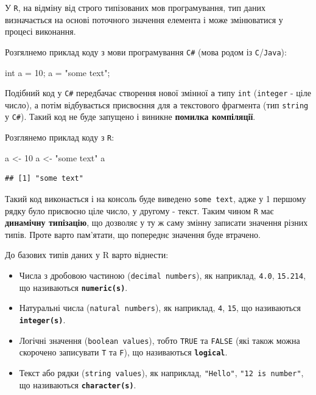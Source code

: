 \documentclass[
]{book}
\newenvironment{Shaded}{\begin{snugshade}}{\end{snugshade}}
\newcommand{\DataTypeTok}[1]{\textcolor[rgb]{0.13,0.29,0.53}{#1}}
\newcommand{\DecValTok}[1]{\textcolor[rgb]{0.00,0.00,0.81}{#1}}
\newcommand{\NormalTok}[1]{#1}
\newcommand{\OtherTok}[1]{\textcolor[rgb]{0.56,0.35,0.01}{#1}}
\newcommand{\StringTok}[1]{\textcolor[rgb]{0.31,0.60,0.02}{#1}}
\providecommand{\tightlist}{%
  \setlength{\itemsep}{0pt}\setlength{\parskip}{0pt}}
\begin{document}
У \texttt{R}, на відміну від строго типізованих мов програмування, тип даних визначається на основі поточного значення елемента і може змінюватися у процесі виконання.

Розгялнемо приклад коду з мови програмування \texttt{C\#} (мова родом із \texttt{C}/\texttt{Java}):

\begin{Shaded}
\begin{Highlighting}[]
\DataTypeTok{int}\NormalTok{ a = }\DecValTok{10}\NormalTok{;}
\NormalTok{a = }\StringTok{"some text"}\NormalTok{;}
\end{Highlighting}
\end{Shaded}

Подібний код у \texttt{C\#} передбачає створення нової змінної \texttt{a} типу \texttt{int} (\texttt{integer} - ціле число), а потім відбувається присвоєння для \texttt{a} текстового фрагмента (тип \texttt{string} у \texttt{С\#}). Такий код не буде запущено і виникне {\textbf{помилка компіляції}}.

Розглянемо приклад коду з \texttt{R}:

\begin{Shaded}
\begin{Highlighting}[]
\NormalTok{a }\OtherTok{\textless{}{-}} \DecValTok{10}
\NormalTok{a }\OtherTok{\textless{}{-}} \StringTok{"some text"}
\NormalTok{a}
\end{Highlighting}
\end{Shaded}

\begin{verbatim}
## [1] "some text"
\end{verbatim}

Такий код виконається і на консоль буде виведено \texttt{some\ text}, адже у 1 першому рядку було присвоєно ціле число, у другому - текст. Таким чином \texttt{R} має \textbf{динамічну типізацію}, що дозволяє у ту ж саму змінну записати значення різних типів. Проте варто пам'ятати, що попереднє значення буде втрачено.

До базових типів даних у R варто віднести:

\begin{itemize}
\tightlist
\item
  Числа з дробовою частиною (\texttt{decimal\ numbers}), як наприклад, \texttt{4.0}, \texttt{15.214}, що називаються \textbf{\texttt{numeric(s)}}.
\item
  Натуральні числа (\texttt{natural\ numbers}), як наприклад, \texttt{4}, \texttt{15}, що називаються \textbf{\texttt{integer(s)}}.
\item
  Логічні значення (\texttt{boolean\ values}), тобто \texttt{TRUE} та \texttt{FALSE} (які також можна скорочено записувати \texttt{T} та \texttt{F}), що називаються \textbf{\texttt{logical}}.
\item
  Текст або рядки (\texttt{string\ values}), як наприклад, \texttt{"Hello"}, \texttt{"12\ is\ number"}, що називаються \textbf{\texttt{character(s)}}.
\end{itemize}
\end{document}
